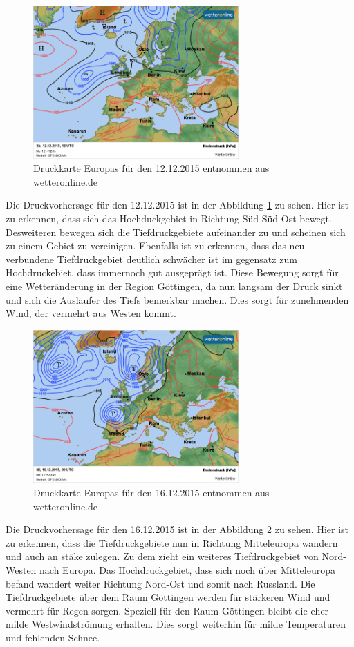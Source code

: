 \documentclass[12pt,a4paper,titlepage,headinclude]{scrartcl}
\numberwithin{equation}{subsection}
\begin{document}
\begin{figure}[!h]
\centering
\includegraphics[width=0.7\textwidth]{wetter1212.png}
\caption{Druckkarte Europas für den 12.12.2015 entnommen aus wetteronline.de}
\label{fig:w1212}
\end{figure}
Die Druckvorhersage für den 12.12.2015 ist in der Abbildung \ref{fig:w1212} zu sehen.
Hier ist zu erkennen, dass sich das Hochduckgebiet in Richtung Süd-Süd-Ost bewegt.
Desweiteren bewegen sich die Tiefdruckgebiete aufeinander zu und scheinen sich zu einem Gebiet zu vereinigen.
Ebenfalls ist zu erkennen, dass das neu verbundene Tiefdruckgebiet deutlich schwächer ist im gegensatz zum Hochdruckebiet, dass immernoch gut ausgeprägt ist.
Diese Bewegung sorgt für eine Wetteränderung in der Region Göttingen, da nun langsam der Druck sinkt und sich die Ausläufer des Tiefs bemerkbar machen.
Dies sorgt für zunehmenden Wind, der vermehrt aus Westen kommt.

\begin{figure}[!h]
\centering
\includegraphics[width=0.7\textwidth]{wetter1612.png}
\caption{Druckkarte Europas für den 16.12.2015 entnommen aus wetteronline.de}
\label{fig:w1612}
\end{figure}
Die Druckvorhersage für den 16.12.2015 ist in der Abbildung \ref{fig:w1612} zu sehen.
Hier ist zu erkennen, dass die Tiefdruckgebiete nun in Richtung Mitteleuropa wandern und auch an stäke zulegen.
Zu dem zieht ein weiteres Tiefdruckgebiet von Nord-Westen nach Europa.
Das Hochdruckgebiet, dass sich noch über Mitteleuropa befand wandert weiter Richtung Nord-Ost und somit nach Russland.
Die Tiefdruckgebiete über dem Raum Göttingen werden für stärkeren Wind und vermehrt für Regen sorgen.
Speziell für den Raum Göttingen bleibt die eher milde Westwindströmung erhalten.
Dies sorgt weiterhin für milde Temperaturen und fehlenden Schnee.
\end{document}
